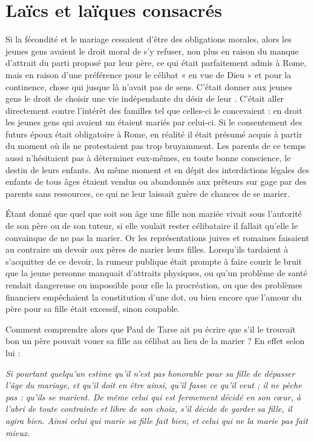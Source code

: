 \section{Laïcs et laïques consacrés}

 Si la fécondité et le mariage cessaient d'être des obligations morales, alors les jeunes gens avaient le droit moral de s'y refuser, non plus en raison du manque d'attrait du parti proposé par leur père, ce qui était parfaitement admis à Rome, mais en raison d'une préférence pour le célibat « en vue de Dieu » et pour la continence, chose qui jusque là n'avait pas de sens. C'était donner aux jeunes gens le droit de choisir une vie indépendante du désir de leur . C'était aller directement contre l'intérêt des familles tel que celles-ci le concevaient : en droit les jeunes gens qui avaient un  étaient mariés par celui-ci. Si le consentement des futurs époux était obligatoire à Rome, en réalité il était présumé acquis à partir du moment où ils ne protestaient pas trop bruyamment. Les parents de ce temps aussi n'hésitaient pas à déterminer eux-mêmes, en toute bonne conscience, le destin de leurs enfants. Au même moment et en dépit des interdictions légales des enfants de tous âges étaient vendus ou abandonnés aux prêteurs sur gage par des parents sans ressources, ce qui ne leur laissait guère de chances de se marier.

 Étant donné que quel que soit son âge une fille non mariée vivait sous l'autorité de son père ou de son tuteur, si elle voulait rester célibataire il fallait qu'elle le convainque de ne pas la marier. Or les représentations juives et romaines faisaient au contraire un devoir aux pères de marier leurs filles. Lorsqu'ils tardaient à s'acquitter de ce devoir, la rumeur publique était prompte à faire courir le bruit que la jeune personne manquait d'attraits physiques, ou qu'un problème de santé rendait dangereuse ou impossible pour elle la procréation, ou que des problèmes financiers empêchaient la constitution d'une dot, ou bien encore que l'amour du père pour sa fille était excessif, sinon coupable. 

 Comment comprendre alors que Paul de Tarse ait pu écrire que s'il le trouvait bon un père pouvait vouer sa fille au célibat au lieu de la marier ? En effet selon lui :

\begin{displayquote}[I~Cor~7,~36-38]
\emph{Si pourtant quelqu'un estime qu'il n'est pas honorable pour sa fille de dépasser l'âge du mariage, et qu'il doit en être ainsi, qu'il fasse ce qu'il veut ; il ne pèche pas : qu'ils se marient. De même celui qui est fermement décidé en son cœur, à l'abri de toute contrainte et libre de son choix, s'il décide de garder sa fille, il agira bien. Ainsi celui qui marie sa fille fait bien, et celui qui ne la marie pas fait mieux}.
\end{displayquote}

